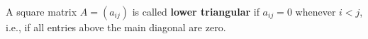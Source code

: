 A square matrix $A = (a_{ij})$ is called \textbf{lower triangular} if $a_{ij} = 0$ whenever $i < j$, i.e., if all entries above the main diagonal are zero.
